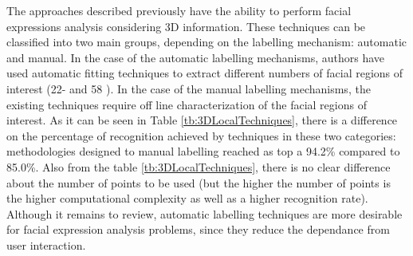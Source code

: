 The approaches described previously have the ability to perform facial expressions analysis considering 3D information. These techniques can be classified into two main groups, depending on the labelling mechanism: automatic and manual. In the case of the automatic labelling mechanisms, authors have used automatic fitting techniques to extract different numbers of facial regions of interest (22- \cite{Rosato2008} and 58 \cite{Wang2007}). In the case of the manual labelling mechanisms, the existing techniques require off line characterization of the facial regions of interest. As it can be seen in Table \ref{tb:3DLocalTechniques}, there is a difference on the percentage of recognition achieved by techniques in these two categories: methodologies designed to manual labelling reached as top a 94.2\% compared to 85.0\%. Also from the table \ref{tb:3DLocalTechniques}, there is no clear difference about the number of points to be used (but the higher the number of points is the higher computational complexity as well as a higher recognition rate). Although it remains to review, automatic labelling techniques are more desirable for facial expression analysis problems, since they reduce the dependance from user interaction.

